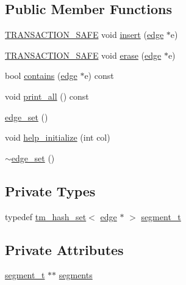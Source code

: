 \subsection*{Public Member Functions}
\begin{DoxyCompactItemize}
\item 
\hyperlink{common_8hpp_a77872cb9748b204f4b1c44ba6141b862}{T\-R\-A\-N\-S\-A\-C\-T\-I\-O\-N\-\_\-\-S\-A\-F\-E} void \hyperlink{classedge__set_a412368ce88c3703ba3160a84c85a7ba9}{insert} (\hyperlink{classedge}{edge} $\ast$e)
\item 
\hyperlink{common_8hpp_a77872cb9748b204f4b1c44ba6141b862}{T\-R\-A\-N\-S\-A\-C\-T\-I\-O\-N\-\_\-\-S\-A\-F\-E} void \hyperlink{classedge__set_a4cd26bf920c05e300c6856848870aeb9}{erase} (\hyperlink{classedge}{edge} $\ast$e)
\item 
bool \hyperlink{classedge__set_a6c7d0d9c29b7d8422942bd40e038d590}{contains} (\hyperlink{classedge}{edge} $\ast$e) const 
\item 
void \hyperlink{classedge__set_aad055d2afc3506ec7b62e2a42414dc04}{print\-\_\-all} () const 
\item 
\hyperlink{classedge__set_ae1ed923da6246a7e70030404e4c8af2d}{edge\-\_\-set} ()
\item 
void \hyperlink{classedge__set_a7fad8e778b5c76c07472464eb95cba82}{help\-\_\-initialize} (int col)
\item 
\hyperlink{classedge__set_ad26a9ebf7424e70d566b92fc07139c94}{$\sim$edge\-\_\-set} ()
\end{DoxyCompactItemize}
\subsection*{Private Types}
\begin{DoxyCompactItemize}
\item 
typedef \hyperlink{classtm__hash__set}{tm\-\_\-hash\-\_\-set}$<$ \hyperlink{classedge}{edge} $\ast$ $>$ \hyperlink{classedge__set_a73211eddc41cffe43f31f9d5924c8843}{segment\-\_\-t}
\end{DoxyCompactItemize}
\subsection*{Private Attributes}
\begin{DoxyCompactItemize}
\item 
\hyperlink{classedge__set_a73211eddc41cffe43f31f9d5924c8843}{segment\-\_\-t} $\ast$$\ast$ \hyperlink{classedge__set_a27bd0bf58ec76f7b3b1390c6fe8fe809}{segments}
\end{DoxyCompactItemize}



